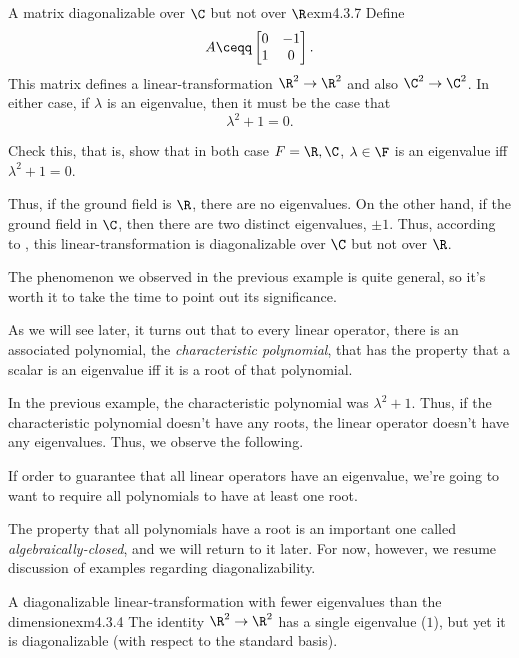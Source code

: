 \begin{exm}{A matrix diagonalizable over $\C$ but not over $\R$}{exm4.3.7}
	Define
	\begin{equation}
		A\ceqq \begin{bmatrix}0 & -1 \\ 1 & 0\end{bmatrix}.
	\end{equation}
	This matrix defines a linear-transformation $\R ^2\rightarrow \R ^2$ and also $\C ^2\rightarrow \C ^2$.  In either case, if $\lambda$ is an eigenvalue, then it must be the case that
	\begin{equation}
		\lambda ^2+1=0.
	\end{equation}
	\begin{exr}[breakable=false]{}{}
		Check this, that is, show that in both case $F=\R ,\C$, $\lambda \in \F$ is an eigenvalue iff $\lambda ^2+1=0$.
	\end{exr}

	Thus, if the ground field is $\R$, there are no eigenvalues.  On the other hand, if the ground field in $\C$, then there are two distinct eigenvalues, $\pm 1$.  Thus, according to , this linear-transformation is diagonalizable over $\C$ but not over $\R$.
\end{exm}
The phenomenon we observed in the previous example is quite general, so it's worth it to take the time to point out its significance.
\begin{displayquote}
	As we will see later, it turns out that to every linear operator, there is an associated polynomial, the \emph{characteristic polynomial}, that has the property that a scalar is an eigenvalue iff it is a root of that polynomial. 
\end{displayquote}
In the previous example, the characteristic polynomial was $\lambda ^2+1$.  Thus, if the characteristic polynomial doesn't have any roots, the linear operator doesn't have any eigenvalues.  Thus, we observe the following.
\begin{displayquote}
	If order to guarantee that all linear operators have an eigenvalue, we're going to want to require all polynomials to have at least one root.
\end{displayquote}
The property that all polynomials have a root is an important one called \emph{algebraically-closed}, and we will return to it later.  For now, however, we resume discussion of examples regarding diagonalizability.
\begin{exm}{A diagonalizable linear-transformation with fewer eigenvalues than the dimension}{exm4.3.4}
	The identity $\R ^2\rightarrow \R ^2$ has a single eigenvalue ($1$), but yet it is diagonalizable (with respect to the standard basis).
\end{exm}
